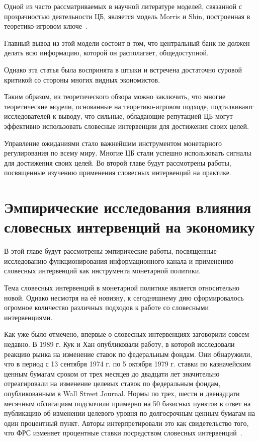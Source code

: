 \documentclass[14pt,a4paper, oneside]{extreport}
\begin{document}
Одной из часто рассматриваемых в научной литературе моделей, связанной с прозрачностью деятельности ЦБ, является модель Morris и Shin, построенная в теоретико-игровом ключе~\cite{morris2005central}.

Главный вывод из этой модели состоит в том, что центральный банк не должен делать всю информацию, которой он располагает, общедоступной. 

Однако эта статья была воспринята в штыки и встречена достаточно суровой критикой со стороны многих видных экономистов. 

Таким образом, из теоретического обзора можно заключить, что многие теоретические модели, основанные на теоретико-игровом подходе, подталкивают исследователей к выводу, что сильные, обладающие репутацией ЦБ могут эффективно использовать словесные интервенции для достижения своих целей.

Управление ожиданиями стало важнейшим инструментом монетарного регулирования по всему миру. Многие ЦБ стали успешно использовать сигналы для достижения своих целей. Во второй главе будут рассмотрены работы, посвященные изучению применения словесных интервенций на практике.


\chapter{Эмпирические исследования влияния словесных интервенций на экономику}

В этой главе будут рассмотрены эмпирические работы, посвященные исследованию функционирования информационного канала и применению словесных интервенций как инструмента монетарной политики. 

Тема словесных интервенций в монетарной политике является относительно новой. Однако несмотря на её новизну, к сегодняшнему дню сформировалось огромное количество различных подходов к работе со словесными интервенциями.

Как уже было отмечено, впервые о словесных интервенциях заговорили совсем недавно. В 1989 г. Кук и Хан опубликовали работу, в которой исследовали реакцию рынка на изменение ставок по федеральным фондам. Они обнаружили, что в период с 13 сентября 1974 г. по 5 октября 1979 г. ставки по казначейским ценным бумагам сроком от трех месяцев до двадцати лет значительно отреагировали на изменение целевых ставок по федеральным фондам, опубликованным в Wall Street Journal. Нормы по трех, шести и двенадцати месячным облигациям подскочили примерно на 50 базисных пунктов в ответ на публикацию об изменении целевого уровня по долгосрочным ценным бумагам на один процентный пункт. Авторы интерпретировали это как свидетельство того, что ФРС изменяет процентные ставки посредством словесных интервенций~\cite{cook1989effect}.
\end{document}
